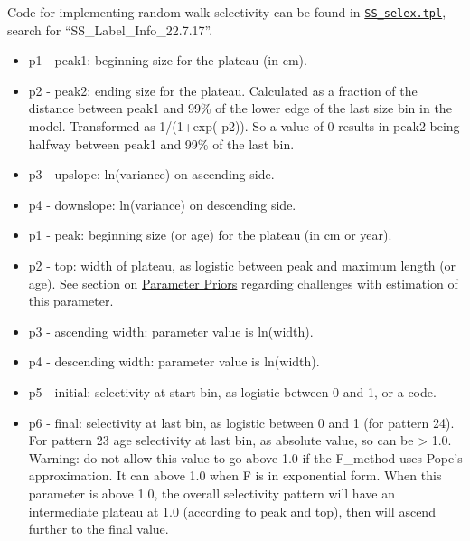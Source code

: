 Code for implementing random walk selectivity can be found in \href{https://github.com/nmfs-ost/ss3-source-code/blob/main/SS_selex.tpl}{\texttt{SS\_selex.tpl}}, search for ``SS\_Label\_Info\_22.7.17''.

\hypertarget{DoubleNormalPlateau}{}
	\begin{itemize}
		\item p1 - peak1: beginning size for the plateau (in cm).
		\item p2 - peak2: ending size for the plateau. Calculated as a fraction of the distance between peak1 and 99\% of the lower edge of the last size bin in the model. Transformed as 1/(1+exp(-p2)). So a value of 0 results in peak2 being halfway between peak1 and 99\% of the last bin.
		\item p3 - upslope: ln(variance) on ascending side.
		\item p4 - downslope: ln(variance) on descending side.
	\end{itemize}

\hypertarget{DoubleNormalPeak}{}
	\begin{itemize}
		\item p1 - peak: beginning size (or age) for the plateau (in cm or year).
		\item p2 - top: width of plateau, as logistic between peak and maximum length (or age). See section on \hyperlink{PriorDescrip}{Parameter Priors} regarding challenges with estimation of this parameter.
		\item p3 - ascending width: parameter value is ln(width).
		\item p4 - descending width: parameter value is ln(width).
		\item p5 - initial: selectivity at start bin, as logistic between 0 and 1, or a code.
		\item p6 - final: selectivity at last bin, as logistic between 0 and 1 (for pattern 24). For pattern 23 age selectivity at last bin, as absolute value, so can be > 1.0. Warning: do not allow this value to go above 1.0 if the F\_method uses Pope's approximation. It can above 1.0 when F is in exponential form. When this parameter is above 1.0, the overall selectivity pattern will have an intermediate plateau at 1.0 (according to peak and top), then will ascend further to the final value.
	\end{itemize}
	
